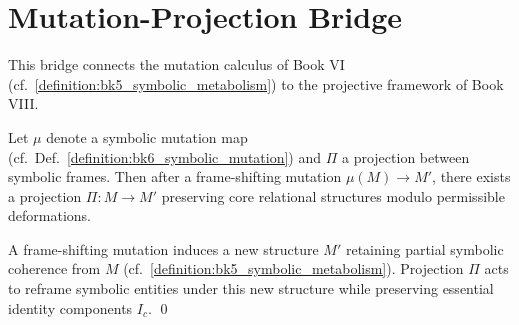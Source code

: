\section{Mutation-Projection Bridge}
\label{sec:bk8_mutuation_projection_bridge}
This bridge connects the mutation calculus of Book VI (cf.~\ref{definition:bk5_symbolic_metabolism}) to the projective framework of Book VIII.
\begin{lemma}
\label{lemma:bk8_mutation_projection}
Let $\mu$ denote a symbolic mutation map (cf.~Def.~\ref{definition:bk6_symbolic_mutation}) and $\Pi$ a projection between symbolic frames. Then after a frame-shifting mutation $\mu(M) \to M'$, there exists a projection $\Pi : M \to M'$ preserving core relational structures modulo permissible deformations.
\end{lemma}
\begin{demonstratio}[Projection]
\label{demonstratio:bk8_projection}
A frame-shifting mutation induces a new structure $M'$ retaining partial symbolic coherence from $M$ (cf.~\ref{definition:bk5_symbolic_metabolism}). Projection $\Pi$ acts to reframe symbolic entities under this new structure while preserving essential identity components $I_c$. \qed
\end{demonstratio}
